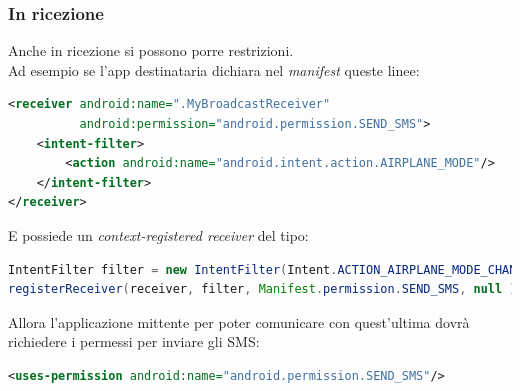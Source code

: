 \documentclass{book}
\begin{document}
\subsubsection{In ricezione}
Anche in ricezione si possono porre restrizioni.\\
Ad esempio se l'app destinataria dichiara nel \textit{manifest} queste linee:
\begin{lstlisting}[language=XML]
<receiver android:name=".MyBroadcastReceiver"
          android:permission="android.permission.SEND_SMS">
    <intent-filter>
        <action android:name="android.intent.action.AIRPLANE_MODE"/>
    </intent-filter>
</receiver>
\end{lstlisting}
E possiede un \textit{context-registered receiver} del tipo:
\begin{lstlisting}[language=Java]
IntentFilter filter = new IntentFilter(Intent.ACTION_AIRPLANE_MODE_CHANGED);
registerReceiver(receiver, filter, Manifest.permission.SEND_SMS, null );
\end{lstlisting}
Allora l'applicazione mittente per poter comunicare con quest'ultima dovrà richiedere i permessi per inviare gli SMS:
\begin{lstlisting}[language=XML]
<uses-permission android:name="android.permission.SEND_SMS"/>
\end{lstlisting}
\end{document}
